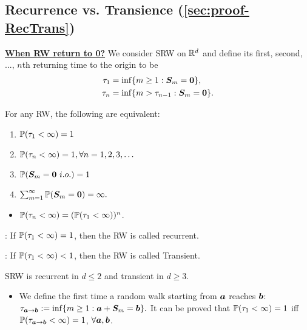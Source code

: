 \documentclass[10pt,a4paper]{article}
\begin{document}
\subsection{Recurrence vs. Transience (\ref{sec:proof-RecTrans})}\label{sec:RecTrans}
\noindent \underline{\textbf{When RW return to 0?}}
We consider SRW on $\mathbb R^d$ and define its first, second, ..., $n$th returning time to the origin to be 
\begin{align*}
	\tau_{1}&=\inf\{m\geq1:{\boldsymbol S}_{m}={\boldsymbol 0}\},\\\tau_{n}&=\inf\{m>\tau_{n-1}:{\boldsymbol S}_{m}={\boldsymbol 0}\}.
\end{align*}

\begin{thmbox}
	\begin{theorem}\label{thm:returnTimeRW}
		For any RW, the following are equivalent:
		\begin{enumerate}[label=(\roman*)]
			\item $\mathbb P(\tau_{1}<\infty)=1$ 
			\item $\mathbb P(\tau_{n}<\infty)=1, \forall n=1,2,3,\ldots$
			\item $\bbP(\S_{m}=\0 \ i.o.)=1$
			\item $\sum_{m=1}^{\infty}\mathbb P({\boldsymbol S}_{m}={\boldsymbol 0})=\infty.$ 
		\end{enumerate}
	\end{theorem}
\end{thmbox}
\begin{itemize}
	\item $\mathbb P(\tau_n<\infty)=(\mathbb P(\tau_1<\infty))^n$. 
\end{itemize}

\noindent {}: If $\mathbb P (\tau_1<\infty )=1$, then the RW is called recurrent.

\noindent {}: If $\mathbb P (\tau_1<\infty )<1$, then the RW is called Transient.


\begin{thmbox}
	\begin{theorem}\label{thm:RecSRW}
		SRW is recurrent in $d\leq 2$ and transient in $d\geq 3$.   
	\end{theorem}
\end{thmbox}
\begin{itemize}
	\item We define the first time a random walk starting from ${\boldsymbol a}$ reaches ${\boldsymbol b}$: $\tau_{{\boldsymbol a}\to {\boldsymbol b}}:=\inf\{m\geq1:{\boldsymbol a}+{\boldsymbol S}_m={\boldsymbol b}\}.$ It can be proved that $\mathbb P(\tau_1<\infty )=1$ iff $\mathbb P(\tau_{{\boldsymbol a}\to {\boldsymbol b}}<\infty )=1$, $\forall {\boldsymbol a},{\boldsymbol b}$.   
\end{itemize}
\end{document}
